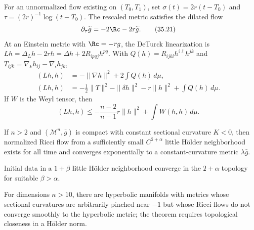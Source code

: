 For an unnormalized flow existing on $(T_0,T_1)$, set
$\sigma(t)=2r(t-T_0)$ and $\tau=(2r)^{-1}\log(t-T_0)$.  The rescaled metric
satisfies the dilated flow
\begin{equation*}
 \partial_\tau\widetilde g=-2\Rc-2r\widetilde g.
 \tag{35.21}
\end{equation*}
At an Einstein metric with $\Rc=-rg$, the DeTurck linearization is
$Lh=\Delta_Lh-2rh=\Delta h+2R_{ipqj}h^{pq}$.  With
$Q(h)=R_{ijkl}h^{i\ell}h^{jk}$ and
$T_{ijk}=\nabla_kh_{ij}-\nabla_ih_{jk}$,
\begin{align*}
 (Lh,h)&=-\|\nabla h\|^2+2\int Q(h)\,d\mu, \tag{35.22}\\
 (Lh,h)&=-\tfrac12\|T\|^2-\|\delta h\|^2-r\|h\|^2+\int Q(h)\,d\mu. \tag{35.23}
\end{align*}
If $W$ is the Weyl tensor, then
\begin{equation*}
 (Lh,h)\le -\frac{n-2}{n-1}r\|h\|^2+\int W(h,h)\,d\mu.
 \tag{35.24}
\end{equation*}

\begin{theorem}
\label{thm:chow-iv-negative-curvature-stability}
If $n>2$ and $(\mathcal M^n,\bar g)$ is compact with constant sectional
curvature $K<0$, then normalized Ricci flow from a sufficiently small
$C^{2+\alpha}$ little H\"older neighborhood exists for all time and converges
exponentially to a constant-curvature metric $\lambda\bar g$.
\end{theorem}

\begin{remark}
\label{rem:chow-iv-negative-curvature-regularity}
Initial data in a $1+\beta$ little H\"older neighborhood converge in the
$2+\alpha$ topology for suitable $\beta>\alpha$.
\end{remark}

\begin{remark}
\label{rem:chow-iv-negative-curvature-obstruction}
For dimensions $n>10$, there are hyperbolic manifolds with metrics whose
sectional curvatures are arbitrarily pinched near $-1$ but whose Ricci flows
do not converge smoothly to the hyperbolic metric; the theorem requires
topological closeness in a H\"older norm.
\end{remark}

